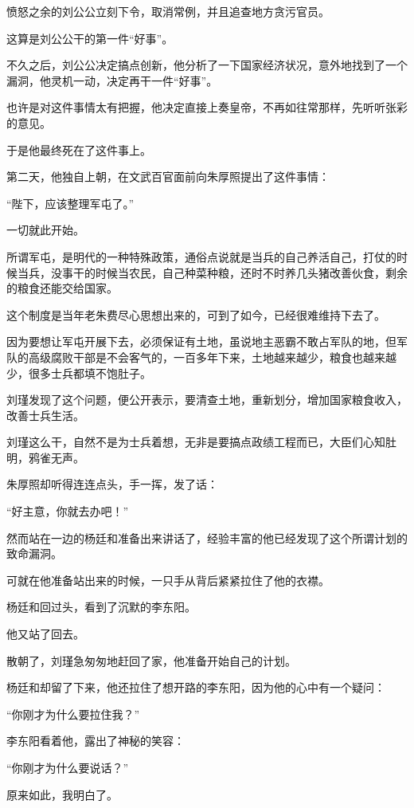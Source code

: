 \begin{multicols}{\theparacolNo}
愤怒之余的刘公公立刻下令，取消常例，并且追查地方贪污官员。

这算是刘公公干的第一件“好事”。

不久之后，刘公公决定搞点创新，他分析了一下国家经济状况，意外地找到了一个漏洞，他灵机一动，决定再干一件“好事”。

也许是对这件事情太有把握，他决定直接上奏皇帝，不再如往常那样，先听听张彩的意见。

于是他最终死在了这件事上。

第二天，他独自上朝，在文武百官面前向朱厚照提出了这件事情：

“陛下，应该整理军屯了。”

一切就此开始。

所谓军屯，是明代的一种特殊政策，通俗点说就是当兵的自己养活自己，打仗的时候当兵，没事干的时候当农民，自己种菜种粮，还时不时养几头猪改善伙食，剩余的粮食还能交给国家。

这个制度是当年老朱费尽心思想出来的，可到了如今，已经很难维持下去了。

因为要想让军屯开展下去，必须保证有土地，虽说地主恶霸不敢占军队的地，但军队的高级腐败干部是不会客气的，一百多年下来，土地越来越少，粮食也越来越少，很多士兵都填不饱肚子。

刘瑾发现了这个问题，便公开表示，要清查土地，重新划分，增加国家粮食收入，改善士兵生活。

刘瑾这么干，自然不是为士兵着想，无非是要搞点政绩工程而已，大臣们心知肚明，鸦雀无声。

朱厚照却听得连连点头，手一挥，发了话：

“好主意，你就去办吧！”

然而站在一边的杨廷和准备出来讲话了，经验丰富的他已经发现了这个所谓计划的致命漏洞。

可就在他准备站出来的时候，一只手从背后紧紧拉住了他的衣襟。

杨廷和回过头，看到了沉默的李东阳。

他又站了回去。

散朝了，刘瑾急匆匆地赶回了家，他准备开始自己的计划。

杨廷和却留了下来，他还拉住了想开路的李东阳，因为他的心中有一个疑问：

“你刚才为什么要拉住我？”

李东阳看着他，露出了神秘的笑容：

“你刚才为什么要说话？”

原来如此，我明白了。
\ifnum{}
	\end{multicols}
\fi
\newpage
